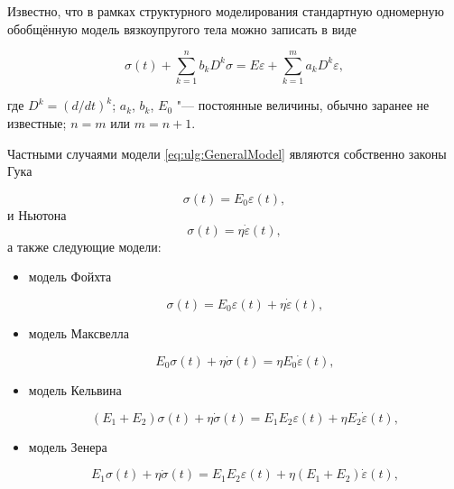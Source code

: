 Известно, что в рамках структурного моделирования стандартную одномерную обобщённую модель вязкоупругого тела можно записать в виде 

\begin{equation}\label{eq:ulg:GeneralModel}

\sigma(t)+\sum^{n}_{k=1}b_{k}D^{k}\sigma=E\varepsilon+\sum^{m}_{k=1}a_{k}D^{k}\varepsilon,

\end{equation}

где $D^{k}=\left(d/dt\right)^{k}$; $a_{k}$, $b_{k}$, $E_{0}$ "--- постоянные величины, обычно заранее не известные; $n=m$ или $m=n+1$. 

Частными случаями модели \eqref{eq:ulg:GeneralModel} являются собственно законы Гука 

$$\sigma(t)=E_{0}\varepsilon(t),$$ и Ньютона $$\sigma(t)=\eta\dot{\varepsilon}(t),$$ а также следующие модели: 

\begin{itemize}

\item модель Фойхта

\begin{equation}\label{eq:ulg:Voigt}

\sigma(t)=E_{0}\varepsilon(t)+\eta\dot{\varepsilon}(t),

\end{equation}

\item модель Максвелла

\begin{equation}\label{eq:ulg:Maxwell}

 E_{0}\sigma(t)+\eta\dot{\sigma}(t)=\eta E_{0}\dot{\varepsilon}(t),

\end{equation}

\item модель Кельвина

\begin{equation}\label{eq:ulg:Kelvin}

\left(E_{1}+E_{2}\right)\sigma(t)+\eta\dot{\sigma}(t)=E_{1}E_{2}\varepsilon(t)+\eta E_{2}\dot{\varepsilon}(t),

\end{equation}

\item модель Зенера

 \begin{equation}\label{eq:ulg:Zener}

 E_{1}\sigma(t)+\eta\dot{\sigma}(t)=E_{1}E_{2}\varepsilon(t)+\eta(E_{1}+E_{2})\dot{\varepsilon}(t),

\end{equation}

\end{itemize}

